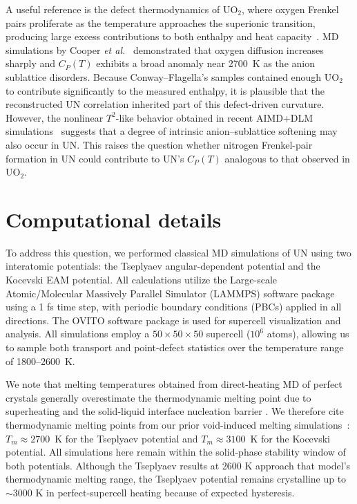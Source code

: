 \documentclass[preprint,12pt,sort&compress]{elsarticle}
\newcommand{\?}{\stackrel{?}{=}}
\begin{document}
A useful reference is the defect thermodynamics of UO$_2$, where oxygen Frenkel pairs proliferate as the temperature approaches the superionic transition, producing large excess contributions to both enthalpy and heat capacity~\cite{Pavlov2017}. MD simulations by Cooper \textit{et al.}~\cite{Cooper2014} demonstrated that oxygen diffusion increases sharply and $C_{P}(T)$ exhibits a broad anomaly near 2700~K as the anion sublattice disorders. Because Conway–Flagella's samples contained enough UO$_2$ to contribute significantly to the measured enthalpy, it is plausible that the reconstructed UN correlation inherited part of this defect-driven curvature. However, the nonlinear $T^{2}$-like behavior obtained in recent AIMD+DLM simulations~\cite{AbdulHameed2025} suggests that a degree of intrinsic anion–sublattice softening may also occur in UN. This raises the question whether nitrogen Frenkel-pair formation in UN could contribute to UN's $C_P(T)$ analogous to that observed in UO$_2$.

\section{Computational details}

To address this question, we performed classical MD simulations of UN using two interatomic potentials: the Tseplyaev angular-dependent potential \cite{Tseplyaev2016} and the Kocevski EAM potential. All calculations utilize the Large-scale Atomic/Molecular Massively Parallel Simulator (LAMMPS) software package \cite{Plimpton1995, Thompson2022} using a 1 fs time step, with periodic boundary conditions (PBCs) applied in all directions. The OVITO software package \cite{Stukowski2010} is used for supercell visualization and analysis. All simulations employ a $50 \times 50 \times 50$ supercell ($10^6$ atoms), allowing us to sample both transport and point-defect statistics over the  temperature range of 1800--2600~K.

We note that melting temperatures obtained from direct-heating MD of perfect crystals generally overestimate the thermodynamic melting point due to superheating and the solid-liquid interface nucleation barrier \cite{Alavi2006, Zhang2012}. We therefore cite thermodynamic melting points from our prior void-induced melting simulations~\cite{AbdulHameed2024}: $T_m \approx 2700$~K for the Tseplyaev potential and $T_m \approx 3100$~K for the Kocevski potential. All simulations here remain within the solid-phase stability window of both potentials. Although the Tseplyaev results at 2600 K approach that model's thermodynamic melting range, the Tseplyaev potential remains crystalline up to $\sim$3000 K in perfect-supercell heating because of expected hysteresis.
\end{document}
